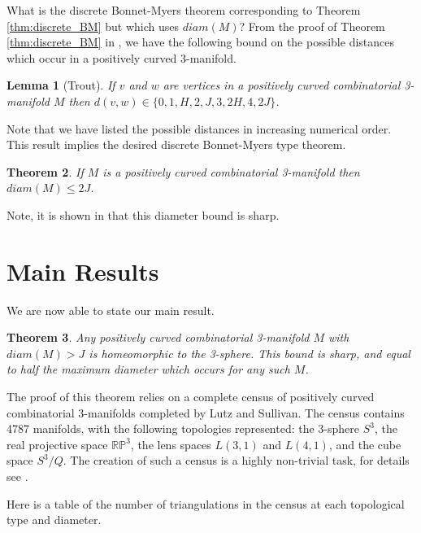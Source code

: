 \documentclass[12pt]{article}
\newtheorem{thm}{Theorem}[section]
\newtheorem{lem}[thm]{Lemma}
\begin{document}
What is the discrete Bonnet-Myers theorem corresponding to Theorem \ref{thm:discrete_BM} but which uses $diam(M)$? From the proof of Theorem \ref{thm:discrete_BM} in \cite{Trout10}, we have the following bound on the possible distances which occur in a positively curved 3-manifold.

\begin{lem}[Trout] If $v$ and $w$ are vertices in a positively curved combinatorial 3-manifold $M$ then $d(v,w) \in \{0, 1, H, 2, J, 3, 2H, 4, 2J \}$.
\end{lem}

\noindent Note that we have listed the possible distances in increasing numerical order. This result implies the desired discrete Bonnet-Myers type theorem.

\begin{thm} If $M$ is a positively curved combinatorial 3-manifold then $diam(M) \leq 2J$.
\label{thm:discrete_BM_expanded_paths}
\end{thm}

\noindent Note, it is shown in \cite{Trout10} that this diameter bound is sharp.

\section{Main Results}

We are now able to state our main result.

\begin{thm} Any positively curved combinatorial 3-manifold $M$ with $diam(M)>J$ is homeomorphic to the 3-sphere. This bound is sharp, and equal to half the maximum diameter which occurs for any such $M$.
\label{thm:discrete_GS}
\end{thm}

\noindent The proof of this theorem relies on a complete census of positively curved combinatorial 3-manifolds completed by Lutz and Sullivan. The census contains 4787 manifolds, with the following topologies represented: the 3-sphere $S^3$, the real projective space $\mathbb{RP}^3$, the lens spaces $L(3,1)$ and $L(4,1)$, and the cube space $S^3/Q$. The creation of such a census is a highly non-trivial task, for details see \cite{LutzSul}.

Here is a table of the number of triangulations in the census at each topological type and diameter.\vspace{.1in}
\end{document}
